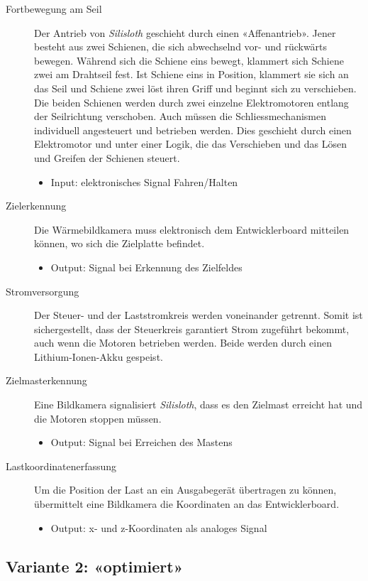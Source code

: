 \documentclass[a4paper,11pt]{scrartcl}
\begin{document}
\begin{description}
    \item[Fortbewegung am Seil] Der Antrieb von \textit{Silisloth} geschieht durch einen «Affenantrieb». Jener besteht aus zwei Schienen, die sich abwechselnd vor- und rückwärts bewegen. Während sich die Schiene eins bewegt, klammert sich Schiene zwei am Drahtseil fest. Ist Schiene eins in Position, klammert sie sich an das Seil und Schiene zwei löst ihren Griff und beginnt sich zu verschieben. Die beiden Schienen werden durch zwei einzelne Elektromotoren entlang der Seilrichtung verschoben. Auch müssen die Schliessmechanismen individuell angesteuert und betrieben werden. Dies geschieht durch einen Elektromotor und unter einer Logik, die das Verschieben und das Lösen und Greifen der Schienen steuert.
    \begin{itemize}
        \item Input: elektronisches Signal Fahren/Halten
    \end{itemize}
    \item[Zielerkennung] Die Wärmebildkamera muss elektronisch dem Entwicklerboard mitteilen können, wo sich die Zielplatte befindet.
    \begin{itemize}
        \item Output: Signal bei Erkennung des Zielfeldes
    \end{itemize}
    \item[Stromversorgung] Der Steuer- und der Laststromkreis werden voneinander getrennt. Somit ist sichergestellt, dass der Steuerkreis garantiert Strom zugeführt bekommt, auch wenn die Motoren betrieben werden. Beide werden durch einen Lithium-Ionen-Akku gespeist.
    \item[Zielmasterkennung] Eine Bildkamera signalisiert \textit{Silisloth}, dass es den Zielmast erreicht hat und die Motoren stoppen müssen.
    \begin{itemize}
        \item Output: Signal bei Erreichen des Mastens
    \end{itemize}
    \item[Lastkoordinatenerfassung] Um die Position der Last an ein Ausgabegerät übertragen zu können, übermittelt eine Bildkamera die Koordinaten an das Entwicklerboard.
    \begin{itemize}
        \item Output: x- und z-Koordinaten als analoges Signal
    \end{itemize}
\end{description}

\subsection{Variante 2: «optimiert»}
\end{document}
